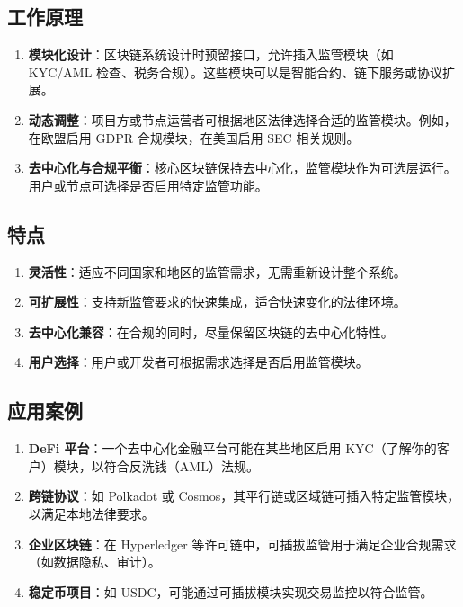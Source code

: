 \documentclass[12pt]{ctexart}
\begin{document}
\subsection{工作原理}
\begin{enumerate}
    \item \textbf{模块化设计}：区块链系统设计时预留接口，允许插入监管模块（如 KYC/AML 检查、税务合规）。这些模块可以是智能合约、链下服务或协议扩展。
    \item \textbf{动态调整}：项目方或节点运营者可根据地区法律选择合适的监管模块。例如，在欧盟启用 GDPR 合规模块，在美国启用 SEC 相关规则。
    \item \textbf{去中心化与合规平衡}：核心区块链保持去中心化，监管模块作为可选层运行。用户或节点可选择是否启用特定监管功能。
\end{enumerate}

\subsection{特点}
\begin{enumerate}
    \item \textbf{灵活性}：适应不同国家和地区的监管需求，无需重新设计整个系统。
    \item \textbf{可扩展性}：支持新监管要求的快速集成，适合快速变化的法律环境。
    \item \textbf{去中心化兼容}：在合规的同时，尽量保留区块链的去中心化特性。
    \item \textbf{用户选择}：用户或开发者可根据需求选择是否启用监管模块。
\end{enumerate}

\subsection{应用案例}
\begin{enumerate}
    \item \textbf{DeFi 平台}：一个去中心化金融平台可能在某些地区启用 KYC（了解你的客户）模块，以符合反洗钱（AML）法规。
    \item \textbf{跨链协议}：如 Polkadot 或 Cosmos，其平行链或区域链可插入特定监管模块，以满足本地法律要求。
    \item \textbf{企业区块链}：在 Hyperledger 等许可链中，可插拔监管用于满足企业合规需求（如数据隐私、审计）。
    \item \textbf{稳定币项目}：如 USDC，可能通过可插拔模块实现交易监控以符合监管。
\end{enumerate}
\end{document}
